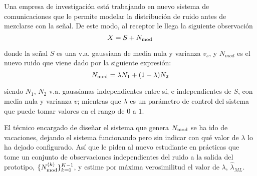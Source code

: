 \ifspanish

\question[25]  %

Una empresa de investigación está trabajando en nuevo sistema de comunicaciones que le permite modelar la distribución de ruido antes de mezclarse con la señal. De este modo, al receptor le llega la siguiente observación
$$ X= S+N_{\rm mod}$$

donde la señal $S$ es una v.a. gaussiana de media nula y varianza $v_s$, y $N_{mod}$ es el nuevo ruido que viene dado por la siguiente expresión:
$$N_{\rm mod} = \lambda  N_1 + (1-\lambda) N_2$$

siendo $N_1$, $N_2$  v.a. gaussianas independientes entre sí, e independientes de $S$, con media nula y varianza $v$; mientras que  $\lambda$ es un parámetro de control del sistema que puede tomar valores en el rango de $0$ a $1$.


El técnico encargado de diseñar el sistema que genera $N_{\rm mod}$ se ha ido de vacaciones, dejando el sistema funcionando pero sin indicar con qué valor de $\lambda$ lo ha dejado configurado. Así que le piden al nuevo estudiante en prácticas que tome un conjunto de observaciones independientes del ruido a la salida del prototipo, $\{N_{\rm mod}^{(k)}\}_{k=0}^{K-1}$, y estime por máxima verosimilitud el valor de $\lambda$, $\hat{\lambda}_{ML}$.

